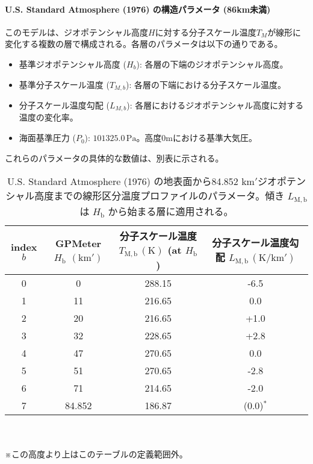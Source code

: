 \documentclass[a4paper,12pt]{article}
\begin{document}
\paragraph{U.S. Standard Atmosphere (1976) の構造パラメータ (86km未満)}
このモデルは、ジオポテンシャル高度$H$に対する分子スケール温度$T_M$が線形に変化する複数の層で構成される。各層のパラメータは以下の通りである。
\begin{itemize}
    \item 基準ジオポテンシャル高度 ($H_b$): 各層の下端のジオポテンシャル高度。
    \item 基準分子スケール温度 ($T_{M,b}$): 各層の下端における分子スケール温度。
    \item 分子スケール温度勾配 ($L_{M,b}$): 各層におけるジオポテンシャル高度に対する温度の変化率。
    \item 海面基準圧力 ($P_0$): $101325.0 \, \mathrm{Pa}$。高度0mにおける基準大気圧。
\end{itemize}
これらのパラメータの具体的な数値は、別表に示される。
\begin{table}[h!]
\centering
\small %
\renewcommand{\arraystretch}{1.3} %
\caption{U.S. Standard Atmosphere (1976) の地表面から84.852 $\mathrm{km}'$ジオポテンシャル高度までの線形区分温度プロファイルのパラメータ。傾き $L_{\mathrm{M,b}}$ は $H_{\mathrm{b}}$ から始まる層に適用される。}
\label{tab:us_std_atm_params_below_86km}
\begin{tabular}{cccc}
\toprule
\makecell{\textbf{index} \\ \textbf{$b$}} & \makecell{\textbf{GPMeter $H_{\mathrm{b}}$} \\ \textbf{$(\mathrm{km}')$}} & \makecell{\textbf{分子スケール温度} \\ \textbf{$T_{\mathrm{M,b}} \, (\mathrm{K})$ (at $H_{\mathrm{b}}$)}} & \makecell{\textbf{分子スケール温度勾配} \\ \textbf{$L_{\mathrm{M,b}} \, (\mathrm{K/km}')$}} \\
\midrule
0 & 0       & 288.15 & -6.5 \\
1 & 11      & 216.65 &  0.0 \\
2 & 20      & 216.65 & +1.0 \\
3 & 32      & 228.65 & +2.8 \\
4 & 47      & 270.65 &  0.0 \\
5 & 51      & 270.65 & -2.8 \\
6 & 71      & 214.65 & -2.0 \\
7 & 84.852  & 186.87 &  (0.0)$^*$  \\
\bottomrule
\end{tabular}
\\
　
\\
\footnotesize{※この高度より上はこのテーブルの定義範囲外。}
\end{table}
\end{document}
